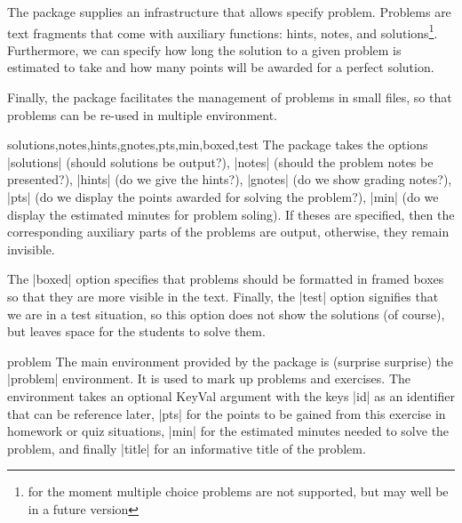 The  package supplies an infrastructure that allows specify problem.  Problems
are text fragments that come with auxiliary functions: hints, notes, and
solutions\footnote{for the moment multiple choice problems are not supported, but may
  well be in a future version}. Furthermore, we can specify how long the solution to a
given problem is estimated to take and how many points will be awarded for a perfect
solution.

Finally, the  package facilitates the management of problems in small files,
so that problems can be re-used in multiple environment. 

\begin{function}{solutions,notes,hints,gnotes,pts,min,boxed,test}
  The  package takes the options |solutions| (should solutions be output?),
  |notes| (should the problem notes be presented?), |hints| (do we give the hints?),
  |gnotes| (do we show grading notes?), |pts| (do we display the points awarded for
  solving the problem?), |min| (do we display the estimated minutes for problem
  soling). If theses are specified, then the corresponding auxiliary parts of the problems
  are output, otherwise, they remain invisible.

  The |boxed| option specifies that problems should be formatted in framed boxes so that
  they are more visible in the text. Finally, the |test| option signifies that we are in a
  test situation, so this option does not show the solutions (of course), but leaves space
  for the students to solve them.
\end{function}

\begin{environment}{problem}
  The main environment provided by the package is (surprise surprise) the
  |problem| environment. It is used to mark up problems and exercises. The environment
  takes an optional KeyVal argument with the keys |id| as an identifier that can be
  reference later, |pts| for the points to be gained from this exercise in homework or
  quiz situations, |min| for the estimated minutes needed to solve the problem, and
  finally |title| for an informative title of the problem.
\end{environment}

